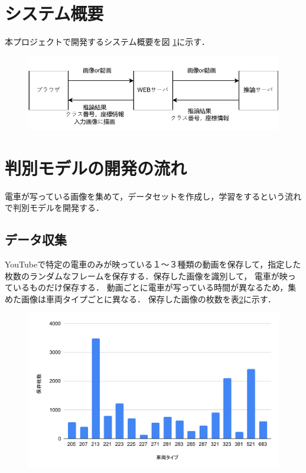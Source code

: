 \begin{multicols*}{2}
\section{システム概要}
本プロジェクトで開発するシステム概要を図 \ref{abc}に示す．
\begin{figure} %
	\label{abc}
	\centering
	\includegraphics[width=\linewidth]{obj/system.pdf}
\end{figure}

\section{判別モデルの開発の流れ}
電車が写っている画像を集めて，データセットを作成し，学習をするという流れで判別モデルを開発する．

\subsection{データ収集}
	YouTubeで特定の電車のみが映っている１〜３種類の動画を保存して，指定した枚数のランダムなフレームを保存する．保存した画像を識別して，	電車が映っているものだけ保存する．
	動画ごとに電車が写っている時間が異なるため，集めた画像は車両タイプごとに異なる．
	保存した画像の枚数を表\ref{fig:chart}に示す．
	
	\begin{figure}
		\centering
		\includegraphics[width=\linewidth]{obj/chart.pdf}
		\label{fig:chart}
	\end{figure}

\end{multicols*}
